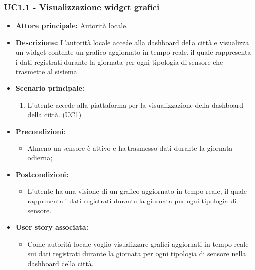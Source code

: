 \subsubsection{UC1.1 - Visualizzazione widget grafici}
\begin{itemize}
    \item \textbf{Attore principale:} Autorità locale.
    \item \textbf{Descrizione:} L'autorità locale accede alla dashboard della città e visualizza un widget contente un grafico aggiornato in tempo reale, il quale rappresenta i dati registrati durante la giornata per ogni tipologia di sensore che trasmette al sistema.
    \item \textbf{Scenario principale:}
          \begin{enumerate}
              \item L'utente accede alla piattaforma per la visualizzazione della dashboard della città. (UC1)
          \end{enumerate}
    \item \textbf{Precondizioni:}
          \begin{itemize}
              \item  Almeno un sensore è attivo e ha trasmesso dati durante la giornata odierna;
          \end{itemize}
    \item \textbf{Postcondizioni:}
          \begin{itemize}
              \item      L'utente ha una visione di un grafico aggiornato in tempo reale, il quale rappresenta i dati registrati durante la giornata per ogni tipologia di sensore.
          \end{itemize}
    \item \textbf{User story associata:}
          \begin{itemize}
              \item Come autorità locale
                    voglio visualizzare grafici aggiornati in tempo reale sui dati registrati durante la giornata per ogni tipologia di sensore nella dashboard della città.
          \end{itemize}

\end{itemize}

